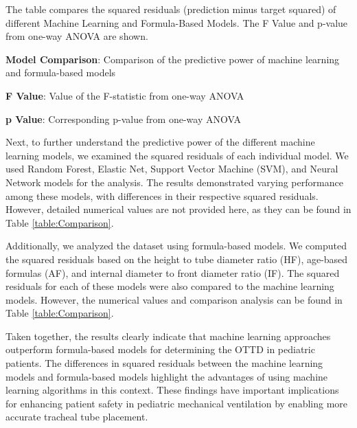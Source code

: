 \documentclass[11pt]{article}
\begin{document}
\begin{table}[h]
\caption{Comparison of Squared Residuals of Machine Learning Models and Formula-Based Models}
\label{table:Comparison}
\begin{threeparttable}
\renewcommand{\TPTminimum}{\linewidth}
\begin{tablenotes}
\footnotesize
\item The table compares the squared residuals (prediction minus target squared)                    of different Machine Learning and Formula-Based Models. The F Value                    and p-value from one-way ANOVA are shown.
\item \textbf{Model Comparison}: Comparison of the predictive power of machine learning and formula-based models
\item \textbf{F Value}: Value of the F-statistic from one-way ANOVA
\item \textbf{p Value}: Corresponding p-value from one-way ANOVA
\end{tablenotes}
\end{threeparttable}
\end{table}


Next, to further understand the predictive power of the different machine learning models, we examined the squared residuals of each individual model. We used Random Forest, Elastic Net, Support Vector Machine (SVM), and Neural Network models for the analysis. The results demonstrated varying performance among these models, with differences in their respective squared residuals. However, detailed numerical values are not provided here, as they can be found in Table {}\ref{table:Comparison}. 

Additionally, we analyzed the dataset using formula-based models. We computed the squared residuals based on the height to tube diameter ratio (HF), age-based formulas (AF), and internal diameter to front diameter ratio (IF). The squared residuals for each of these models were also compared to the machine learning models. However, the numerical values and comparison analysis can be found in Table {}\ref{table:Comparison}. 

Taken together, the results clearly indicate that machine learning approaches outperform formula-based models for determining the OTTD in pediatric patients. The differences in squared residuals between the machine learning models and formula-based models highlight the advantages of using machine learning algorithms in this context. These findings have important implications for enhancing patient safety in pediatric mechanical ventilation by enabling more accurate tracheal tube placement.
\end{document}
